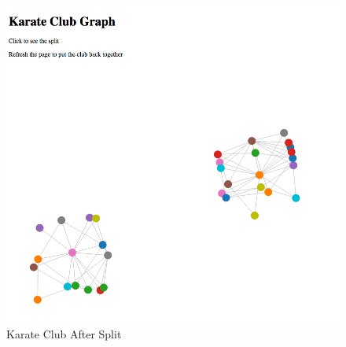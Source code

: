 \documentclass{article}
\begin{document}
\begin{figure}[H]
\centering
\includegraphics[scale=0.50]{q1/kcaftersplit}
\caption{Karate Club After Split}
\label{after}
\end{figure}



\end{document}
